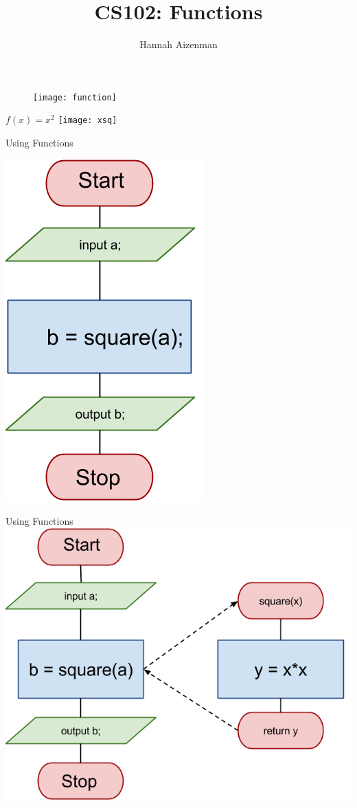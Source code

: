 \documentclass[xcolor={dvipsnames}]{beamer}
\begin{document}
\title{ CS102: Functions }
\author{Hannah Aizenman}

\begin{frame}
	\titlepage
\end{frame}

\begin{frame}[plain]
		\begin{figure}
	\texttt{[image: function]}
		\end{figure}
\end{frame}
\begin{frame}{$f(x)=x^{2}$}
	\texttt{[image: xsq]}
\end{frame}

\begin{frame}{Using Functions}
	\begin{center}
	\includegraphics[width=.4\textwidth]{fsq}
	\end{center}
\end{frame}

\begin{frame}{Using Functions}
	\includegraphics[width=1\textwidth]{fsq_function}
\end{frame}
\end{document}
